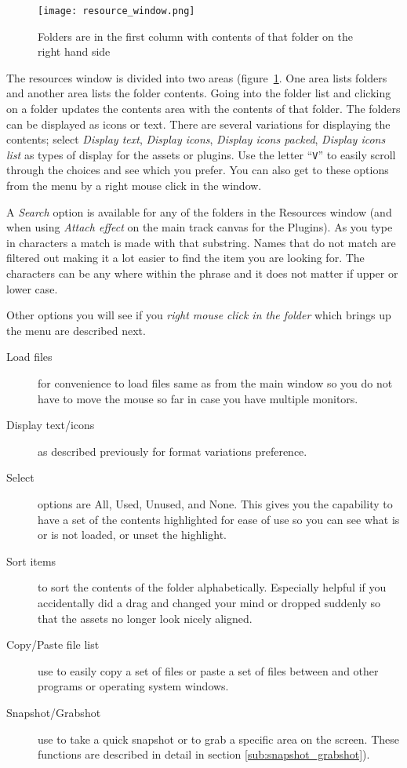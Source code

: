 \begin{figure}[htpb]
    \centering
    \texttt{[image: resource\_window.png]}
    \caption{Folders are in the first column with contents of that folder on the right hand side}
    \label{fig:resource_window}
\end{figure}

The resources window is divided into two areas (figure~\ref{fig:resource_window}. 
One area lists folders and another area lists the folder contents. 
Going into the folder list and clicking on a folder updates the contents area with the contents of that folder. 
The folders can be displayed as icons or text. 
There are several variations for displaying the contents; select \emph{Display text}, \emph{Display icons}, \emph{Display icons packed}, \emph{Display icons list} as types of display for the assets or plugins. 
Use the letter “\texttt{V}” to easily scroll through the choices and see which you prefer.  
You can also get to these options from the menu by a right mouse click in the window.

A \emph{Search} option is available for any of the folders in the Resources window (and when using \textit{Attach effect} on the main track canvas for the Plugins).  
As you type in characters a match is made with that substring.  
Names that do not match are filtered out making it a lot easier to find the item you are looking for.  
The characters can be any where within the phrase and it does not matter if upper or lower case. 

Other options you will see if you \textit{right mouse click in the folder} which brings up the menu are described next.  

\begin{description}
    \item[ Load files ]  for convenience to load files same as from the main window so you do not have to move the mouse so far in case you have multiple monitors.
    \item[Display text/icons]  as described previously for format variations preference.
    \item[Select]  options are All, Used, Unused, and None.  This gives you the capability to have a set of the
        contents highlighted for ease of use so you can see what is or is not loaded, or unset the highlight.
    \item[Sort items]  to sort the contents of the folder alphabetically.  Especially helpful if you accidentally did a 
        drag and changed your mind or dropped suddenly so that the assets no longer look nicely aligned.
    \item[Copy/Paste file list]  use to easily copy a set of files or paste a set of files between \CGG{} and other programs or operating system windows.
    \item[Snapshot/Grabshot]  use to take a quick snapshot or to grab a specific area on the screen.  These functions are described in detail in section \ref{sub:snapshot_grabshot}).
\end{description}

